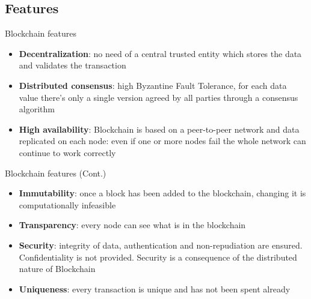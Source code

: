 \documentclass{beamer}
\begin{document}
  \subsection{Features}
  \begin{frame}{Blockchain features}
    \begin{itemize}
      \item \textbf{Decentralization}: no need of a central trusted entity
      which stores the data and validates the transaction \pause
      \item \textbf{Distributed consensus}: high Byzantine Fault
      Tolerance, for each data value there's only a single version agreed by all
      parties through a consensus algorithm \pause
      \item \textbf{High availability}: Blockchain is based on a peer-to-peer
      network and data replicated on each node: even if one or more nodes fail
      the whole network can continue to work correctly
    \end{itemize}
  \end{frame}

  \begin{frame}{Blockchain features (Cont.)}
    \begin{itemize}
      \item \textbf{Immutability}: once a block has been added to the blockchain,
      changing it is computationally infeasible \pause
      \item \textbf{Transparency}: every node can see what is in the blockchain \pause
      \item \textbf{Security}: integrity of data, authentication and non-repudiation
      are ensured. Confidentiality is not provided. Security is a consequence of
      the distributed nature of Blockchain \pause
      \item \textbf{Uniqueness}: every transaction is unique and has not been spent already
    \end{itemize}
  \end{frame}
\end{document}
